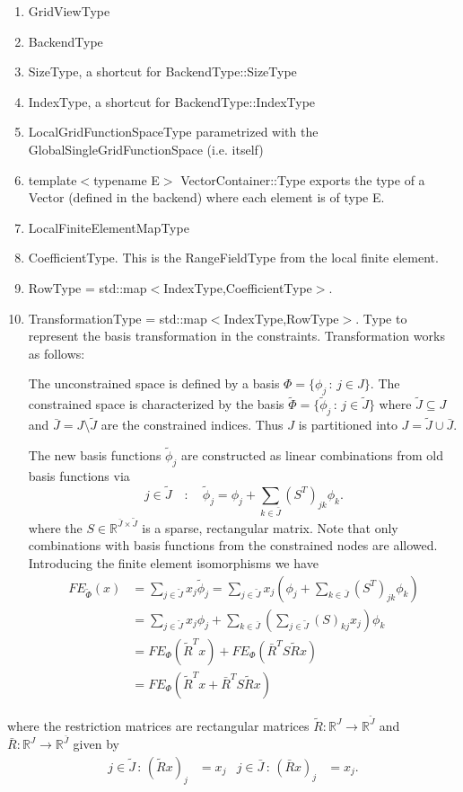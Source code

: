\documentclass[11pt,a4paper,DIV11,%
notitlepage,oneside,abstracton,%
bibtotoc]{scrartcl}
\begin{document}
\begin{enumerate}[1)]
\item GridViewType
\item BackendType
\item SizeType, a shortcut for BackendType::SizeType
\item IndexType, a shortcut for BackendType::IndexType
\item LocalGridFunctionSpaceType parametrized with the GlobalSingleGridFunctionSpace (i.e. itself)
\item template$<$typename E$>$ VectorContainer::Type exports the type of a Vector
  (defined in the backend) where each element is of type E.
\item LocalFiniteElementMapType
\item CoefficientType. This is the RangeFieldType from the local finite element.
\item RowType = std::map$<$IndexType,CoefficientType$>$.
\item TransformationType = std::map$<$IndexType,RowType$>$. Type to
  represent the basis transformation in the
  constraints. Transformation works as follows:

  The unconstrained space is defined by a basis
  $\Phi=\{\phi_j\,:\,j\in J\}$. The constrained space is characterized
  by the basis $\tilde\Phi=\{\tilde\phi_j\,:\,j\in \tilde{J}\}$ where
  $\tilde{J}\subseteq J$ and $\bar{J}=J\setminus\tilde{J}$ are the
  constrained indices. Thus $J$ is partitioned into $J =
  \tilde{J}\cup\bar{J}$. 

  The new basis functions $\tilde{\phi}_j$ are constructed as linear
  combinations from old basis functions via
  \begin{equation}
    j\in\tilde{J} \quad : \quad \tilde\phi_j = \phi_j +
    \sum_{k\in\bar{J}} (S^T)_{jk} \phi_k.
  \end{equation} 
  where the $S\in\mathbb{R}^{\bar{J}\times\tilde{J}}$ is a sparse,
  rectangular matrix. 
  Note that only combinations with basis functions from the
  constrained nodes are allowed. Introducing the finite element
  isomorphisms we have
\begin{equation}
\begin{split}
FE_{\tilde\Phi}(x) &= \sum_{j\in\tilde{J}} x_j \tilde\phi_j = 
\sum_{j\in\tilde{J}} x_j\left(\phi_j +
    \sum_{k\in\bar{J}} (S^T)_{jk} \phi_k\right)\\
&= \sum_{j\in\tilde{J}} x_j\phi_j + \sum_{k\in\bar{J}} \left(
    \sum_{j\in\tilde{J}} (S)_{kj} x_j\right) \phi_k \\
&= FE_{\Phi}(\tilde{R}^T x) + FE_{\Phi}(\bar{R}^TS\tilde{R}x )\\
&= FE_{\Phi}(\tilde{R}^T x + \bar{R}^TS\tilde{R}x)
\end{split}
\end{equation}
\end{enumerate}
where the restriction matrices are rectangular matrices $\tilde{R} :
\mathbb{R}^J \to \mathbb{R}^{\tilde{J}}$ and $\bar{R} :
\mathbb{R}^J \to \mathbb{R}^{\bar{J}}$ given by
\begin{align}
j\in\tilde{J} \,:\, (\tilde{R}x)_j &= x_j &
j\in\bar{J} \,:\, (\bar{R}x)_j &= x_j.
\end{align}
\end{document}
